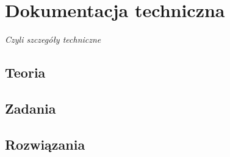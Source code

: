 \section{Dokumentacja techniczna}

\begin{center}
\textit{Czyli szczegóły techniczne}
\end{center}



\subsection{Teoria}


\subsection{Zadania}


\subsection{Rozwiązania}